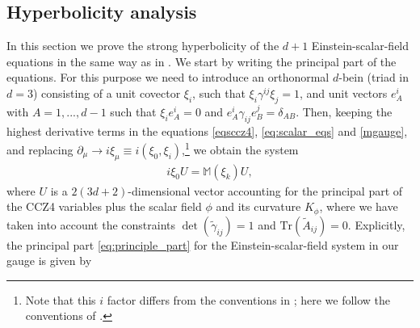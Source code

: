 \documentclass[reprint,aps,amsmath,amssymb,twoside,prd,showkeys,superscriptaddress,nofootinbib]{revtex4-2}
\begin{document}
\subsection{Hyperbolicity analysis}\label{sec:hyp}

In this section we prove the strong hyperbolicity of the $d+1$ Einstein-scalar-field equations in the same way as in \cite{brown}. We start by writing the principal part of the equations. For this purpose we need to introduce an orthonormal $d$-bein (triad in $d=3$) consisting of a unit covector $\xi_i$, such that $\xi_i\gamma^{ij}\xi_j=1$, and unit vectors $e_A^i$ with $A=1,...,d-1$ such that $\xi_ie_A^i=0$ and $e_A^i\gamma_{ij}e_B^j=\delta_{AB}$. Then, keeping the highest derivative terms in the equations \eqref{eqsccz4},  \eqref{eq:scalar_eqs} and \eqref{mgauge}, and replacing $\partial_{\mu}\to i\xi_{\mu}\equiv i(\xi_0,\xi_i)$,\footnote{Note that this $i$ factor differs from the conventions in \cite{brown}; here we follow the conventions of \cite{Kovacs:2020pns,Kovacs:2020ywu}.} we obtain the system
\begin{eqnarray}
i\xi_0U={\mathbb M}(\xi_k)U, 
\label{eq:principle_part}
\end{eqnarray}
where $U$ is a $2(3d+2)$-dimensional vector accounting for the principal part of the CCZ4 variables plus the scalar field $\phi$ and its curvature $K_{\phi}$, where we have taken into account the constraints $\det(\tilde{\gamma}_{ij})=1$ and $\text{Tr}(\tilde{A}_{ij})=0$. Explicitly, the principal part \eqref{eq:principle_part} for the Einstein-scalar-field system in our gauge is given by
\end{document}
